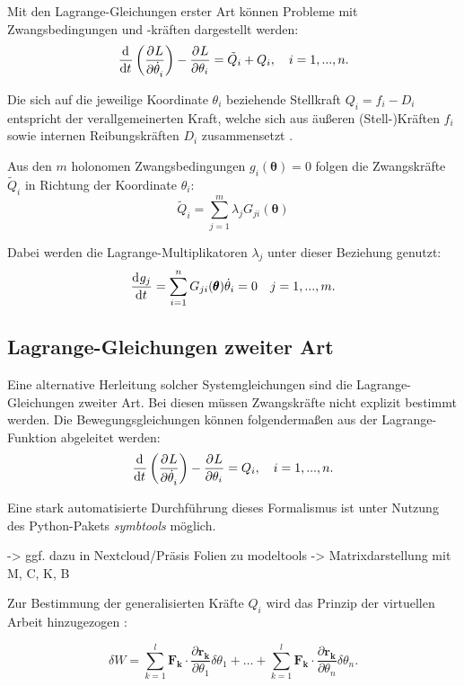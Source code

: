 Mit den Lagrange-Gleichungen erster Art können Probleme mit Zwangsbedingungen und -kräften dargestellt werden:
\begin{equation}
	\frac{\mathrm{d}^{}}{\mathrm{d}{t}^{}}\left(\frac{\partial^{}L}{\partial{\dot{\theta}_i}^{}} \right) - \frac{\partial^{}L}{\partial{\theta_i}^{}} = \tilde{Q}_i + Q_i, \quad i = 1, ..., n.
\end{equation}

Die sich auf die jeweilige Koordinate $\theta_i$ beziehende Stellkraft $Q_i = f_i - D_i$ entspricht der verallgemeinerten Kraft, welche sich aus äußeren (Stell-)Kräften $f_i$ sowie internen Reibungskräften $D_i$ zusammensetzt \cite[S. 49]{Lagrange}.

Aus den $m$ holonomen Zwangsbedingungen $g_i(\pmb{\theta}) = 0$ folgen die Zwangskräfte $\tilde{Q}_i$ in Richtung der Koordinate $\theta_i$:
\begin{equation}
	\tilde{Q}_i = \sum_{j = 1}^m \lambda_j G_{ji}(\pmb{\theta})
\end{equation}

Dabei werden die Lagrange-Multiplikatoren $\lambda_j$ unter dieser Beziehung genutzt:
\begin{equation}
	\frac{\mathrm{d}^{}g_j}{\mathrm{d}{t}^{}} = \sum_{i = 1}^n G_{ji}(\pmb{\theta}) \dot{\theta}_i = 0 \quad j = 1, ..., m.
\end{equation}

\subsection{Lagrange-Gleichungen zweiter Art}
Eine alternative Herleitung solcher Systemgleichungen sind die Lagrange-Gleichungen zweiter Art. Bei diesen müssen Zwangskräfte nicht explizit bestimmt werden. Die Bewegungsgleichungen können folgendermaßen aus der Lagrange-Funktion abgeleitet werden:
\begin{equation}
	\frac{\mathrm{d}^{}}{\mathrm{d}{t}^{}}\left(\frac{\partial^{}L}{\partial{\dot{\theta}_i}^{}} \right) - \frac{\partial^{}L}{\partial{\theta_i}^{}} = Q_i, \quad i = 1, ..., n.
\end{equation} 

Eine stark automatisierte Durchführung dieses Formalismus ist unter Nutzung des Python-Pakets \textit{symbtools} \cite{symbtools} möglich.

-> ggf. dazu in Nextcloud/Präsis Folien zu modeltools -> Matrixdarstellung mit M, C, K, B

Zur Bestimmung der generalisierten Kräfte $Q_i$ wird das Prinzip der virtuellen Arbeit hinzugezogen \cite{VirtualWork}:

\begin{equation}
	\delta W = \sum_{k=1}^l \pmb{F_k} \cdot \frac{\partial \pmb{r_k}}{\partial \theta_1} \delta \theta_1 +\ldots + \sum_{k=1}^l \pmb{F_k} \cdot \frac{\partial \pmb{r_k}}{\partial \theta_n} \delta \theta_n.
\end{equation}

